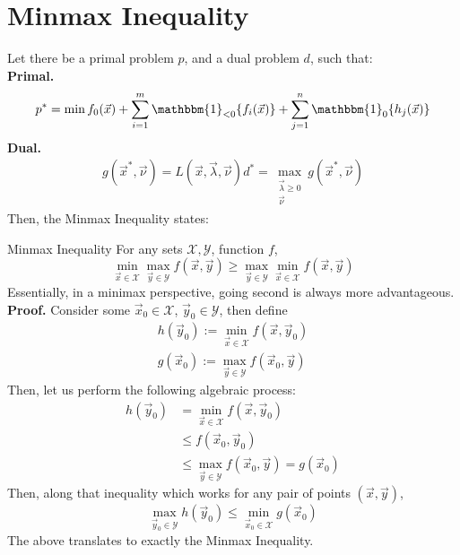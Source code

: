 \section{Minmax Inequality}
Let there be a primal problem $p$, and a dual problem $d$, such that: \\
\textbf{Primal.}
\[
    p^* = \min f_0 (\vec{x}) + \sum_{i = 1}^m \mathbbm{1}_{<0} \{f_i(\vec{x})\} + \sum_{j = 1}^n \mathbbm{1}_{0} \{h_j(\vec{x})\}
\]
\textbf{Dual.}
\begin{align*}
    g(\vec{x}^*, \vec{\nu}) = L(\vec{x}, \vec{\lambda}, \vec{\nu})
    d^* = \max_{\substack{ \vec{\lambda} \geq 0 \\ \vec{\nu}}} g(\vec{x}^*, \vec{\nu})
\end{align*}
Then, the Minmax Inequality states:
\begin{ln-theorem}{Minmax Inequality}{}
    For any sets $\mathcal{X}, \mathcal{Y}$, function $f$,
    \[
        \min_{\vec{x} \in \mathcal{X}} \max_{\vec{y} \in \mathcal{Y}} f(\vec{x}, \vec{y})
        \geq
        \max_{\vec{y} \in \mathcal{Y}} \min_{\vec{x} \in \mathcal{X}} f(\vec{x}, \vec{y})
    \]
    Essentially, in a minimax perspective, going second is always more advantageous.
    \tcblower
    \textbf{Proof.}
    Consider some $\vec{x}_0 \in \mathcal{X}$, $\vec{y}_0 \in \mathcal{Y}$, then define
    \begin{align*}
        h(\vec{y}_0) := \min_{\vec{x} \in \mathcal{X}} f(\vec{x}, \vec{y}_0) \\
        g(\vec{x}_0) := \max_{\vec{y} \in \mathcal{Y}} f(\vec{x}_0, \vec{y})
    \end{align*}
    Then, let us perform the following algebraic process:
    \begin{align*}
        h(\vec{y}_0)
        &= \min_{\vec{x} \in \mathcal{X}} f(\vec{x}, \vec{y}_0) \\
        &\leq f(\vec{x}_0, \vec{y}_0) \\
        &\leq \max_{\vec{y} \in \mathcal{Y}} f(\vec{x}_0, \vec{y}) = g(\vec{x}_0)
    \end{align*}
    Then, along that inequality which works for any pair of points $(\vec{x}, \vec{y})$,
    \[
        \max_{\vec{y}_0 \in \mathcal{Y}} h(\vec{y}_0) \leq \min_{\vec{x}_0 \in \mathcal{X}} g(\vec{x}_0)
    \]
    The above translates to exactly the Minmax Inequality.
\end{ln-theorem}

